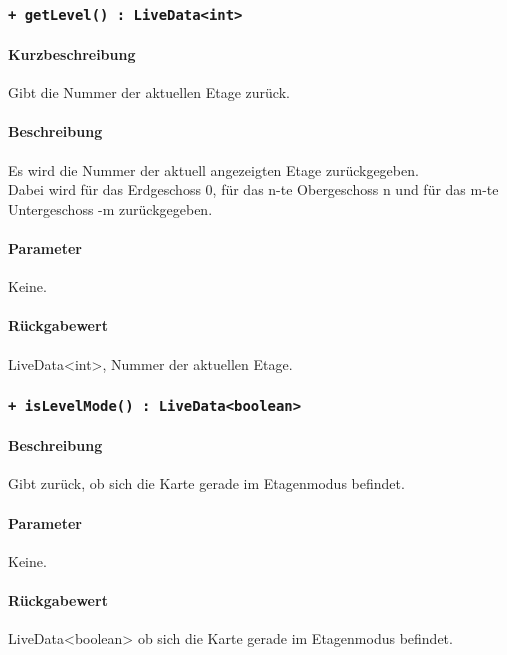 \subsubsection*{\texttt{+ getLevel() : LiveData<int>}}%
\paragraph*{Kurzbeschreibung}
Gibt die Nummer der aktuellen Etage zurück.
\paragraph*{Beschreibung}
Es wird die Nummer der aktuell angezeigten Etage zurückgegeben.\\
Dabei wird für das Erdgeschoss 0, für das n-te Obergeschoss n und für das 
m-te Untergeschoss -m zurückgegeben.
\paragraph*{Parameter}
Keine.
\paragraph*{Rückgabewert}
LiveData<int>, Nummer der aktuellen Etage.

\subsubsection*{\texttt{+ isLevelMode() : LiveData<boolean>}}%
\paragraph*{Beschreibung}
Gibt zurück, ob sich die Karte gerade im Etagenmodus befindet.
\paragraph*{Parameter}
Keine.
\paragraph*{Rückgabewert}
LiveData<boolean> ob sich die Karte gerade im Etagenmodus befindet.
